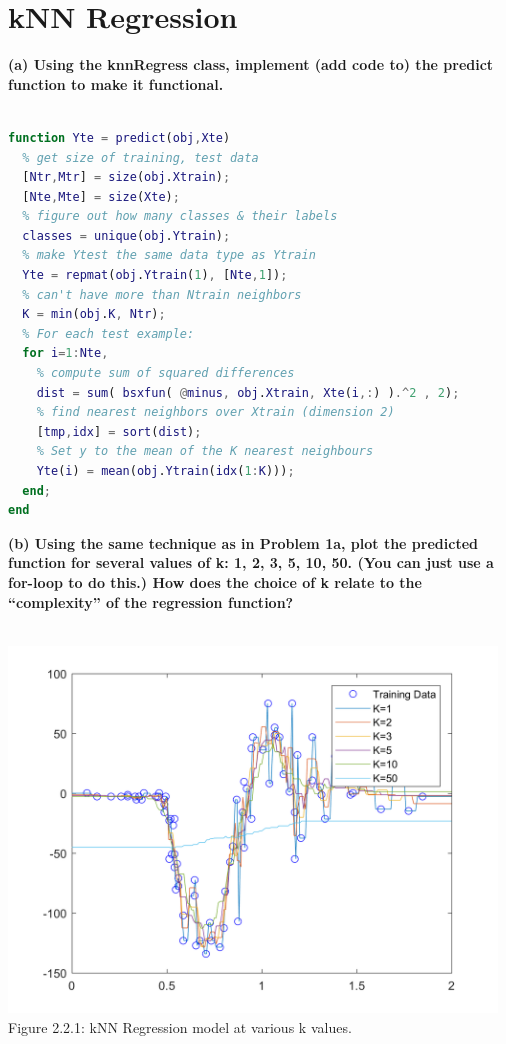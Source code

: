\documentclass[]{report}   %
\begin{document}
\section{kNN Regression}
{\bf (a) Using the knnRegress class, implement (add code to) the predict function to make it functional.}
\\~\\
\begin{lstlisting}[language=Matlab, caption=predict() Implementation]
% Test function: predict on Xtest
function Yte = predict(obj,Xte)
  % get size of training, test data
  [Ntr,Mtr] = size(obj.Xtrain);
  [Nte,Mte] = size(Xte);
  % figure out how many classes & their labels
  classes = unique(obj.Ytrain);        
  % make Ytest the same data type as Ytrain  
  Yte = repmat(obj.Ytrain(1), [Nte,1]);  
  % can't have more than Ntrain neighbors
  K = min(obj.K, Ntr);                  
  % For each test example:
  for i=1:Nte,                
    % compute sum of squared differences          
    dist = sum( bsxfun( @minus, obj.Xtrain, Xte(i,:) ).^2 , 2);  
    % find nearest neighbors over Xtrain (dimension 2)
    [tmp,idx] = sort(dist);                                                
    % Set y to the mean of the K nearest neighbours
    Yte(i) = mean(obj.Ytrain(idx(1:K)));   
  end;
end
\end{lstlisting}
{\bf (b) Using the same technique as in Problem 1a, plot the predicted function for several values of k: 1, 2, 3, 5, 10, 50. (You can just use a for-loop to do this.) How does the choice of k relate to the “complexity” of the regression function?}
\\~\\
\begin{center}
	\includegraphics[width=35em]{2_2_Figure_1.png}
	{Figure 2.2.1: kNN Regression model at various k values.}
\end{center} 
\end{document}
